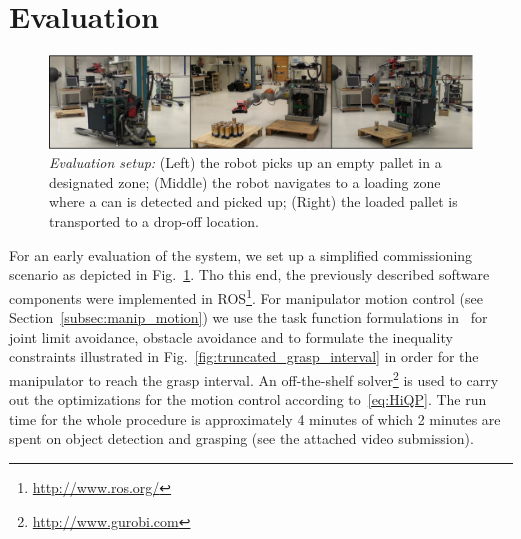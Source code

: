 \section{Evaluation}
\label{sec:eval}
% 
\begin{figure}[t!]
  \begin{center}
    \includegraphics[width =1\linewidth]{figs/evaluation}
    \caption{\textit{Evaluation setup:} (Left) the robot picks up an empty pallet in a designated
      zone; (Middle) the robot navigates to a loading zone where a can is detected and picked up;
      (Right) the loaded pallet is transported to a drop-off location.}
    \label{fig:evaluation}
  \end{center}
\end{figure}
% 
For an early evaluation of the system, we set up a simplified commissioning scenario as depicted in
Fig.~\ref{fig:evaluation}. Tho this end, the previously described software components were
implemented in ROS\footnote{\url{http://www.ros.org/}}. For manipulator motion control (see
Section~\ref{subsec:manip_motion}) we use the task function formulations in~\cite{Kano09} for joint
limit avoidance, obstacle avoidance and to formulate the inequality constraints illustrated in
Fig.~\ref{fig:truncated_grasp_interval} in order for the manipulator to reach the grasp interval. An
off-the-shelf solver\footnote{\url{http://www.gurobi.com}} is used to carry out the optimizations
for the motion control according to~\eqref{eq:HiQP}. The run time for the whole procedure is
approximately 4 minutes of which 2 minutes are spent on object detection and grasping (see the
attached video submission).


